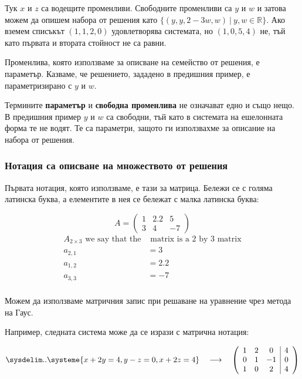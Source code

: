 \documentclass{subfiles}
\begin{document}
\noindent Тук $x$ и $z$ са водещите променливи. Свободните променливи са $y$ и $w$ и затова можем да опишем набора от решения като $\{ (y, y, 2 - 3w, w)\ |\ y, w \in \mathbb{R} \}$. Ако вземем списъкът $(1, 1, 2, 0)$ удовлетворява системата, но $(1, 0, 5, 4)$ не, тъй като първата и втората стойност не са равни.

\noindent Променлива, която използваме за описване на семейство от решения, е параметър. Казваме, че решението, зададено в предишния пример, е параметризирано с $y$ и $w$.

\noindent Термините \textbf{параметър} и \textbf{свободна променлива} не означават едно и също нещо. В предишния пример $y$ и $w$ са свободни, тъй като в системата на ешелонната форма те не водят. Те са параметри, защото ги използвахме за описание на набора от решения.

\subsubsection{Нотация са описване на множеството от решения}

Първата нотация, която използваме, е тази за матрица. Бележи се с голяма латинска буква, а елементите в нея се бележат с малка латинска буква:

\begin{equation*}
    A = \left(
            \begin{array}{ ccc }
                1 & 2.2 & 5 \\
                3 & 4 & -7
            \end{array}
        \right)
\end{equation*}
\begin{align*}
    A_{2 \times 3} \text{ we say that the} & \text{ matrix is a 2 by 3 matrix} \\
    a_{2,1} &= 3 \\
    a_{1,2} &= 2.2 \\
    a_{3,3} &= -7 \\
\end{align*}

\noindent Можем да използваме матричния запис при решаване на уравнение чрез метода на Гаус.

\noindent Например, следната система може да се изрази с матрична нотация:

\begin{equation*}
    \sysdelim..\systeme{
        x + 2y = 4,
        y - z = 0,
        x + 2z = 4
    }
    \quad
    \longrightarrow
    \quad
    \left(
        \begin{array}{ ccc|c }
            1 & 2 & 0 & 4 \\
            0 & 1 & -1 & 0 \\
            1 & 0 & 2 & 4 \\
        \end{array}
    \right)
\end{equation*}
\end{document}
